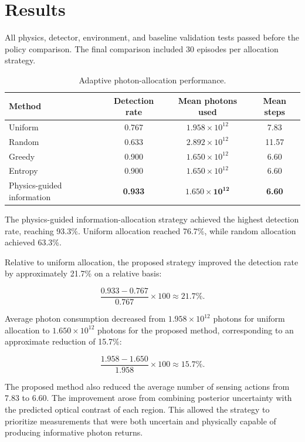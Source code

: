 \section{Results}

All physics, detector, environment, and baseline validation tests passed before the policy comparison. The final comparison included 30 episodes per allocation strategy.

\begin{table}[ht]
\centering
\caption{Adaptive photon-allocation performance.}
\label{tab:baseline_results}
\begin{tabular}{lccc}
\hline
Method & Detection rate & Mean photons used & Mean steps \\
\hline
Uniform & 0.767 & $1.958\times10^{12}$ & 7.83 \\
Random & 0.633 & $2.892\times10^{12}$ & 11.57 \\
Greedy & 0.900 & $1.650\times10^{12}$ & 6.60 \\
Entropy & 0.900 & $1.650\times10^{12}$ & 6.60 \\
Physics-guided information & \textbf{0.933} & $\mathbf{1.650\times10^{12}}$ & \textbf{6.60} \\
\hline
\end{tabular}
\end{table}

The physics-guided information-allocation strategy achieved the highest detection rate, reaching 93.3\%. Uniform allocation reached 76.7\%, while random allocation achieved 63.3\%.

Relative to uniform allocation, the proposed strategy improved the detection rate by approximately 21.7\% on a relative basis:

\begin{equation}
\frac{0.933-0.767}{0.767}\times100
\approx 21.7\%.
\end{equation}

Average photon consumption decreased from $1.958\times10^{12}$ photons for uniform allocation to $1.650\times10^{12}$ photons for the proposed method, corresponding to an approximate reduction of 15.7\%:

\begin{equation}
\frac{1.958-1.650}{1.958}\times100
\approx 15.7\%.
\end{equation}

The proposed method also reduced the average number of sensing actions from 7.83 to 6.60. The improvement arose from combining posterior uncertainty with the predicted optical contrast of each region. This allowed the strategy to prioritize measurements that were both uncertain and physically capable of producing informative photon returns.

